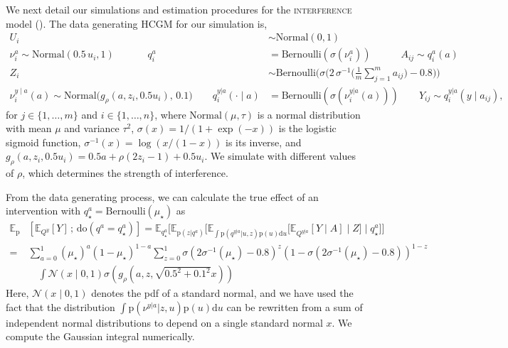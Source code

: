 \documentclass[12pt]{article}
\newcommand{\rmdo}{\mathrm{do}}
\newcommand{\s}{\, ; \,}
\newcommand{\di}{\mathrm{d}}
\newcommand{\pr}{\mathrm{p}}
\begin{document}
We next detail our simulations and estimation procedures for the \textsc{interference} model ().
The data generating HCGM for our simulation is,
\begin{equation*}
\begin{split}
        U_i &\sim \mathrm{Normal}(0, 1)\\
        \nu_i^{a}\sim \mathrm{Normal}( 0.5\,  u_i, 1) \,\,\quad\quad\quad q_i^{a} &= \mathrm{Bernoulli}(\sigma(\nu_i^{a}))
        \quad \quad \quad A_{ij} \sim q^{a}_i(a) \\
         Z_i &\sim \mathrm{Bernoulli}\bigg(\sigma\Big(2\, \sigma^{-1}\Big(\frac{1}{m}\sum_{j=1}^m a_{ij}\Big) - 0.8\Big)\bigg) \\
        \nu_i^{y \mid a}(a) \sim \mathrm{Normal}\big(g_\rho(a, z_i, 0.5 u_i),\, 0.1\big)\quad \quad q_i^{y| a}(\cdot \mid a) &= \mathrm{Bernoulli}(\sigma(\nu_i^{y| a}(a))) \quad \quad Y_{ij} \sim q_i^{y|a}(y \mid a_{ij}),
\end{split}
\end{equation*}
for $j \in \{1, \ldots, m\}$ and $i \in \{1, \ldots, n\}$, where $\mathrm{Normal}(\mu,\tau)$ is a normal distribution with mean $\mu$ and variance $\tau^2$, $\sigma(x) = 1/(1 + \exp(-x))$ is the logistic sigmoid function, $\sigma^{-1}(x) = \log(x/(1 - x))$ is its inverse, and $g_\rho(a, z_i, 0.5 u_i) = 0.5 a + \rho (2 z_i - 1) + 0.5 u_i$.
We simulate with different values of $\rho$, which determines the strength of interference.

From the data generating process, we can calculate the true effect of an intervention with $q_\star^a = \mathrm{Bernoulli}(\mu_\star)$ as
\begin{equation*} \label{eq:true_confound_interfere_sim_effect}
\begin{split}
	\mathbb{E}_{\pr}&[\mathbb{E}_{Q^y}[Y] \s \rmdo(q^a = q^a_\star)]
	= \mathbb{E}_{q_\star^a}\bigg[\mathbb{E}_{\pr(z|q^a)}\Big[\mathbb{E}_{\int \pr(q^{y|a}|u, z) \pr(u) \di u}\big[\mathbb{E}_{Q^{y|a}}[Y\mid A]\mid Z\big]\mid q_\star^a\Big]\bigg]\\
	=&\sum_{a=0}^1 (\mu_\star)^a (1 - \mu_\star)^{1-a} \sum_{z=0}^1 \sigma(2 \sigma^{-1}(\mu_\star) - 0.8)^z ( 1 - \sigma(2 \sigma^{-1}(\mu_\star) - 0.8))^{1-z}
	\\ & \quad \int \mathcal{N}(x \mid 0, 1) \sigma(g_\rho(a, z, \sqrt{0.5^2 + 0.1^2}x)) \end{split}
\end{equation*}
Here, $\mathcal{N}(x \mid 0, 1)$ denotes the pdf of a standard normal, and we have used the fact that the distribution $\int \pr(\nu^{y|a}|z, u)\pr(u) \di u$ can be rewritten from a sum of independent normal distributions to depend on a single standard normal $x$.
We compute the Gaussian integral numerically.
\end{document}
